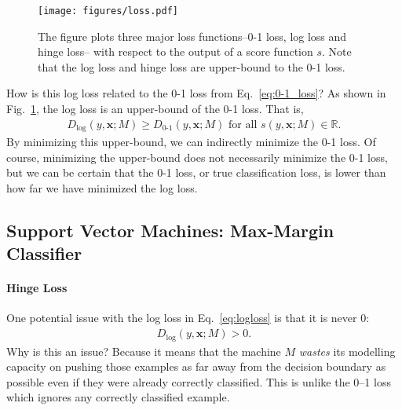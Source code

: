 \documentclass{report}
\newcommand{\vect}[1]{\mathbf{#1}}
\newcommand{\vx}[0]{\vect{x}}
\begin{document}
\begin{figure}[t]
    \centering
    \begin{minipage}{0.6\textwidth}
        \raggedright
        \texttt{[image: figures/loss.pdf]}
    \end{minipage}
    \begin{minipage}{0.39\textwidth}
        \raggedleft
        \caption{
            \label{fig:loss}
            The figure plots three major loss functions--0-1 loss, log loss and
            hinge loss-- with respect to the output of a score function $s$.
            Note that the log loss and hinge loss are upper-bound to the 0-1
            loss.
        }
    \end{minipage}
\end{figure}

How is this log loss related to the 0-1 loss from Eq.~\eqref{eq:0-1_loss}? As
shown in Fig.~\ref{fig:loss}, the log loss is an upper-bound of the 0-1 loss.
That is,
\begin{align*}
    D_{\log}(y, \vx; M) \geq D_{\text{0-1}}(y, \vx; M)\text{ for all }s(y, \vx;
    M) \in \mathbb{R}.
\end{align*}
By minimizing this upper-bound, we can indirectly minimize the 0-1 loss. Of
course, minimizing the upper-bound does not necessarily minimize the 0-1 loss,
but we can be certain that the 0-1 loss, or true classification loss, is lower
than how far we have minimized the log loss. 


\subsection{Support Vector Machines: Max-Margin Classifier}
\label{sec:svm}

\paragraph{Hinge Loss}

One potential issue with the log loss in Eq.~\eqref{eq:logloss} is that it is
never $0$: 
\begin{align*}
    D_{\log}(y, \vx; M) > 0.
\end{align*}
Why is this an issue? Because it means that the machine $M$ {\it wastes} its
modelling capacity on pushing those examples as far away from the decision
boundary as possible even if they were already correctly classified. This is
unlike the 0--1 loss which ignores any correctly classified example. 
\end{document}
